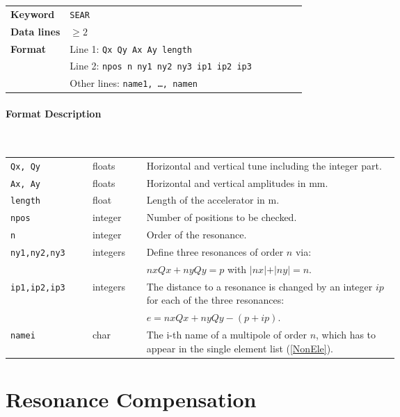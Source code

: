 \bigskip
\begin{tabular}{@{}lp{0.8\linewidth}}
    \textbf{Keyword}    & \texttt{SEAR} \\
    \textbf{Data lines} & $\geq 2$ \\
    \textbf{Format}     & Line 1: \texttt{Qx Qy Ax Ay length} \\
                        & Line 2: \texttt{npos n ny1 ny2 ny3 ip1 ip2 ip3} \\
                        & Other lines: \texttt{name1, \dots , namen}
\end{tabular}

\paragraph{Format Description}~

\bigskip
\begin{longtabu}{@{}llp{0.65\linewidth}}
    \texttt{Qx, Qy}      & floats   & Horizontal and vertical tune including the integer part. \\
    \texttt{Ax, Ay}      & floats   & Horizontal and vertical amplitudes in mm. \\
    \texttt{length}      & float    & Length of the accelerator in m. \\
    \texttt{npos}        & integer  & Number of positions to be checked. \\
    \texttt{n}           & integer  & Order of the resonance. \\
    \texttt{ny1,ny2,ny3} & integers & Define three resonances of order $n$ via: \\
                         &          & \mbox{$nx Qx + ny Qy = p$} with \mbox{$\vert nx \vert + \vert ny \vert = n$}. \\
    \texttt{ip1,ip2,ip3} & integers & The distance to a resonance is changed by an integer $ip$ for each of the three resonances: \\
                         &          & \mbox{$e = nx Qx + ny Qy - (p + ip) $.} \\
    \texttt{namei}       & char     & The i-th name of a multipole of order $n$, which has to appear in the single element list (\ref{NonEle}).
\end{longtabu}

\section{Resonance Compensation} \label{ResCom}


